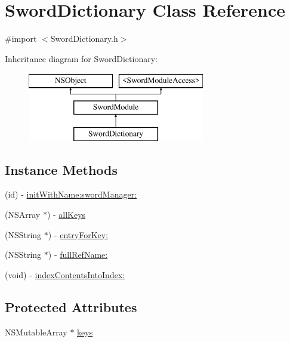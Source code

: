 \hypertarget{interface_sword_dictionary}{\section{Sword\-Dictionary Class Reference}
\label{interface_sword_dictionary}
}


{\ttfamily \#import $<$Sword\-Dictionary.\-h$>$}

Inheritance diagram for Sword\-Dictionary\-:\begin{figure}[H]
\begin{center}
\leavevmode
\includegraphics[height=3.000000cm]{interface_sword_dictionary}
\end{center}
\end{figure}
\subsection*{Instance Methods}
\begin{DoxyCompactItemize}
\item 
(id) -\/ \hyperlink{interface_sword_dictionary_a59d9654a2481d74c2f4d08c15a4910ce}{init\-With\-Name\-:sword\-Manager\-:}
\item 
(N\-S\-Array $\ast$) -\/ \hyperlink{interface_sword_dictionary_a28b5fcb19b63755f3b6ba483a837ac03}{all\-Keys}
\item 
(N\-S\-String $\ast$) -\/ \hyperlink{interface_sword_dictionary_ab2060ce6708b36d5a8c31db9b458a2b4}{entry\-For\-Key\-:}
\item 
(N\-S\-String $\ast$) -\/ \hyperlink{interface_sword_dictionary_a10679ec30bd00acfb4e6d643c89f5af6}{full\-Ref\-Name\-:}
\item 
(void) -\/ \hyperlink{interface_sword_dictionary_ac27de8546781130724ef5aed32a4ec13}{index\-Contents\-Into\-Index\-:}
\end{DoxyCompactItemize}
\subsection*{Protected Attributes}
\begin{DoxyCompactItemize}
\item 
N\-S\-Mutable\-Array $\ast$ \hyperlink{interface_sword_dictionary_a55ba70453314bdf10337607cfe31279b}{keys}
\end{DoxyCompactItemize}
